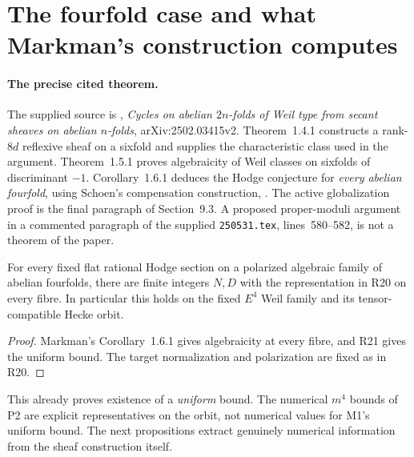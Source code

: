 \section{The fourfold case and what Markman's construction computes}\label{sec:markman}
\paragraph{The precise cited theorem.}
The supplied source is \citet{Markman25}, \emph{Cycles on abelian $2n$-folds of Weil type from secant sheaves on abelian $n$-folds}, arXiv:2502.03415v2. Theorem~1.4.1 constructs a rank-$8d$ reflexive sheaf on a sixfold and supplies the characteristic class used in the argument. Theorem~1.5.1 proves algebraicity of Weil classes on sixfolds of discriminant $-1$. Corollary~1.6.1 deduces the Hodge conjecture for \emph{every abelian fourfold}, using Schoen's compensation construction, \citet[Proposition~10]{Schoen98}. The active globalization proof is the final paragraph of Section~9.3. A proposed proper-moduli argument in a commented paragraph of the supplied \texttt{250531.tex}, lines~580--582, is not a theorem of the paper.

\begin{corollary}\label{M1}
For every fixed flat rational Hodge section on a polarized algebraic family of abelian fourfolds, there are finite integers $N,D$ with the representation in R20 on every fibre. In particular this holds on the fixed $E^4$ Weil family and its tensor-compatible Hecke orbit.
\end{corollary}
\begin{proof}
Markman's Corollary~1.6.1 gives algebraicity at every fibre, and R21 gives the uniform bound. The target normalization and polarization are fixed as in R20.
\end{proof}

This already proves existence of a \emph{uniform} bound. The numerical $m^4$ bounds of P2 are explicit representatives on the orbit, not numerical values for M1's uniform bound. The next propositions extract genuinely numerical information from the sheaf construction itself.

